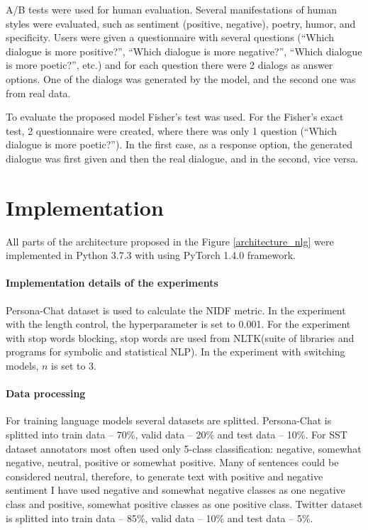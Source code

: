 A/B tests were used for human evaluation. Several manifestations of human styles were evaluated, such as sentiment (positive, negative), poetry, humor, and specificity. Users were given a questionnaire with several questions (``Which dialogue is more positive?'', ``Which dialogue is more negative?'', ``Which dialogue is more poetic?'', etc.) and for each question there were 2 dialogs as answer options. One of the dialogs was generated by the model, and the second one was from real data.

To evaluate the proposed model Fisher's test was used. For the Fisher's exact test, 2 questionnaire were created, where there was only 1 question (``Which dialogue is more poetic?''). In the first case, as a response option, the generated dialogue was first given and then the real dialogue, and in the second, vice versa.

\chapter{Implementation} \label{chap_implementation}
All parts of the architecture proposed in the Figure \ref{architecture_nlg} were implemented in Python 3.7.3 with using PyTorch 1.4.0 framework.

\subsubsection{Implementation details of the experiments}
Persona-Chat dataset is used to calculate the NIDF metric. In the experiment with the length control, the hyperparameter is set to 0.001. For the experiment with stop words blocking, stop words are used from NLTK\protect\footnotemark (suite of libraries and programs for symbolic and statistical NLP). In the experiment with switching models, $n$ is set to 3.


\subsubsection{Data processing}
For training language models several datasets are splitted. Persona-Chat is splitted into train data -- 70\%, valid data -- 20\% and test data -- 10\%. For SST dataset annotators most often used only 5-class classification: negative, somewhat negative, neutral, positive or somewhat positive. Many of sentences could be considered neutral, therefore, to generate text with positive and negative sentiment I have used negative and somewhat negative classes as one negative class and positive, somewhat positive classes as one positive class. Twitter dataset is splitted into train data -- 85\%, valid data -- 10\% and test data -- 5\%.

